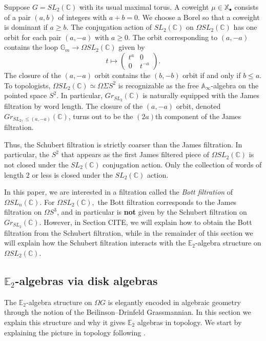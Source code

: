 \begin{exm} \label{sl2example}
Suppose $G=SL_2(\mathbb{C})$ with its usual maximal torus.  A coweight $\mu \in \mathbb{X}_\bullet$ consists of a pair $(a,b)$ of integers with $a+b=0$.  We choose a Borel so that a coweight is dominant if $a \ge b$.  The conjugation action of $SL_2(\mathbb{C})$ on $\Omega SL_2(\mathbb{C})$ has one orbit for each pair $(a,-a)$ with $a \ge 0$.  The orbit corresponding to $(a,-a)$ contains the loop $\mathbb{G}_m \rightarrow \Omega SL_2(\mathbb{C})$ given by
$$
t \mapsto \left( \begin{array}{cc} t^a & 0 \\ 0 & t^{-a}  \end{array} \right).
$$
The closure of the $(a,-a)$ orbit contains the $(b,-b)$ orbit if and only if $b \le a$.  To topologists, $\Omega SL_2(\mathbb{C}) \simeq \Omega \Sigma S^2$ is recognizable as the free $\mathbb{A}_\infty$-algebra on the pointed space $S^2$.  In particular, $Gr_{SL_2}(\mathbb{C})$ is naturally equipped with the James filtration by word length.  The closure of the $(a,-a)$ orbit, denoted $Gr_{SL_2,\le (a,-a)}(\mathbb{C})$, turns out to be the $(2a)$th component of the James filtration.

Thus, the Schubert filtration is strictly coarser than the James filtration.  In particular, the $S^2$ that appears as the first James filtered piece of $\Omega SL_2(\mathbb{C})$ is not closed under the $SL_2(\mathbb{C})$ conjugation action.  Only the collection of words of length $2$ or less is closed under the $SL_2(\mathbb{C})$ action.

In this paper, we are interested in a filtration called the \emph{Bott filtration} of $\Omega SL_n(\mathbb{C}).$  For $\Omega SL_2(\mathbb{C}),$ the Bott filtration corresponds to the James filtration on $\Omega S^3$, and in particular is \textbf{not} given by the Schubert filtration on $Gr_{SL_2}(\mathbb{C})$.  However, in Section CITE, we will explain how to obtain the Bott filtration from the Schubert filtration, while in the remainder of this section we will explain how the Schubert filtration interacts with the $\mathbb{E}_2$-algebra structure on $\Omega SL_2(\mathbb{C})$.
\end{exm}

\subsection{$\mathbb{E}_2$-algebras via disk algebras}

The $\mathbb{E}_2$-algebra structure on $\Omega G$ is elegantly encoded in algebraic geometry through the notion of the Beilinson--Drinfeld Grassmannian.  In this section we explain this structure and why it gives $\mathbb{E}_2$ algebras in topology.  We start by explaining the picture in topology following \cite[\S 5.5]{HA}.


